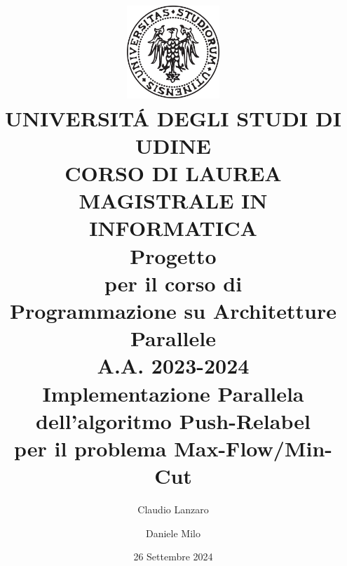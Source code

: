 \documentclass[a4paper]{report}
\begin{document}
	
	\title{
		\includegraphics[width=35mm]{logo_UNIUD.png}\\[4mm]
		\LARGE{UNIVERSIT\'A DEGLI STUDI DI UDINE}\\[4mm]
		\LARGE{CORSO DI LAUREA MAGISTRALE IN INFORMATICA}\\[1cm]
		\LARGE{Progetto}\\[2mm]
		\Large{per il corso di}\\[2mm]
		\LARGE{Programmazione su Architetture Parallele}\\[4mm]
		\Large{A.A. 2023-2024}\\[1cm]
		\LARGE{Implementazione Parallela dell'algoritmo Push-Relabel \\per il problema Max-Flow/Min-Cut}
 		}
 	\author{Claudio Lanzaro \and Daniele Milo}
	\date{26 Settembre 2024}
	\maketitle
	
	\tableofcontents	
	
    

    

    

    

    

    \begin{appendices}

        

        

		

    \end{appendices}

    \printbibliography[title=Riferimenti]
    
\end{document}

